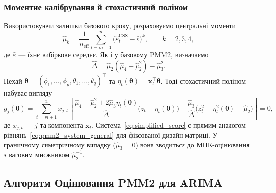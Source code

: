 \documentclass[12pt,a4paper]{article}
\begin{document}
\subsubsection{Моментне калібрування й стохастичний поліном}

Використовуючи залишки базового кроку, розраховуємо центральні моменти
\begin{equation}
\label{eq:css_moments}
\hat{\mu}_k = \frac{1}{n_\text{eff}} \sum_{t=m+1}^{n} \Big(\widehat{\varepsilon}_t^{\text{CSS}} - \bar{\varepsilon}\Big)^k,\qquad k=2,3,4,
\end{equation}
де $\bar{\varepsilon}$ --- їхнє вибіркове середнє. Як і у базовому PMM2, визначаємо
\begin{equation}
\label{eq:delta_hat}
\hat{\Delta} = \hat{\mu}_2(\hat{\mu}_4 - \hat{\mu}_2^2) - \hat{\mu}_3^2.
\end{equation}
Нехай $\boldsymbol{\theta} = (\phi_1,\ldots,\phi_p,\theta_1,\ldots,\theta_q)^\top$ та $\eta_t(\boldsymbol{\theta}) = \mathbf{x}_t^\top\boldsymbol{\theta}$. Тоді стохастичний поліном набуває вигляду
\begin{equation}
\label{eq:simplified_score}
g_j(\boldsymbol{\theta}) = \sum_{t=m+1}^{n} x_{j,t}\,
\left[
\frac{\hat{\mu}_4 - \hat{\mu}_2^2 + 2\hat{\mu}_3 \eta_t(\boldsymbol{\theta})}{\hat{\Delta}}\big(z_t - \eta_t(\boldsymbol{\theta})\big)
-\frac{\hat{\mu}_3}{\hat{\Delta}}\Big(z_t^2 - \eta_t^2(\boldsymbol{\theta}) - \hat{\mu}_2\Big)
\right]=0,
\end{equation}
де $x_{j,t}$ --- $j$-та компонента $\mathbf{x}_t$. Система~\eqref{eq:simplified_score} є прямим аналогом рівнянь~\eqref{eq:pmm2_system_general} для фіксованої дизайн-матриці. У граничному симетричному випадку ($\hat{\mu}_3 = 0$) вона зводиться до МНК-оцінювання з ваговим множником $\hat{\mu}_2^{-1}$.

\subsection{Алгоритм Оцінювання PMM2 для ARIMA}
\label{subsec:algorithm}
\end{document}

